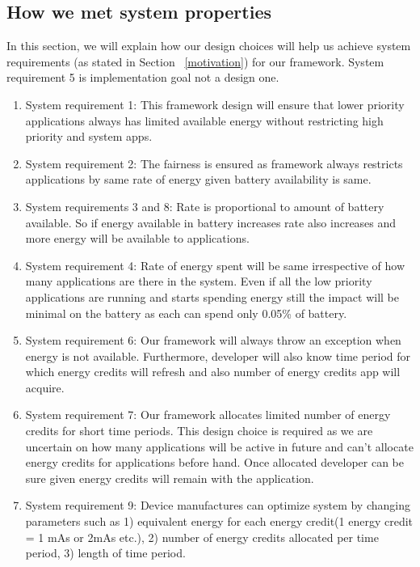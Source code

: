 \subsection{How we met system properties}


In this section, we will explain how our design choices will help us achieve system requirements (as stated in Section ~\ref{motivation}) for our framework. System requirement 5 is implementation goal not a design one.

\begin{enumerate}

\item  System requirement 1: This framework design will ensure that lower priority applications always has limited available energy without restricting high priority and system apps.

\item  System requirement 2: The fairness is ensured as framework always restricts applications by same rate of energy given battery availability is same. 

\item  System requirements 3 and 8: Rate is proportional to amount of battery available. So if energy available in battery increases rate also increases and more energy will be available to applications.

\item System requirement 4: Rate of energy spent will be same irrespective of how many applications are there in the system. Even if all the low priority applications are running and starts spending energy still the impact will be minimal on the battery as each can spend only 0.05\% of battery.

\item System requirement 6: Our framework will always throw an exception when energy is not available. Furthermore, developer will also know time period for which energy credits will refresh and also number of energy credits app will acquire.

\item System requirement 7: Our framework allocates limited number of energy credits for short time periods. This design choice is required as we are uncertain on how many applications will be active in future and can't allocate energy credits for applications before hand. Once allocated developer can be sure given energy credits will remain with the application.

\item System requirement 9: Device manufactures can optimize system by changing parameters such as 1) equivalent energy for each energy credit(1 energy credit = 1 mAs or 2mAs etc.), 2) number of energy credits allocated per time period, 3) length of time period. 

\end{enumerate}

